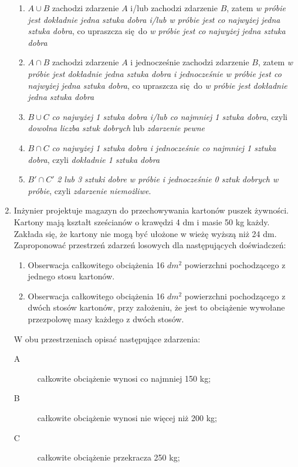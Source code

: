 \documentclass[twoside]{mwart}
\newcommand{\ans}[1]{}
\newenvironment{ansenv}{\comment}{\endcomment}
\newenvironment{ansenv}{\paragraph{Odpowiedź:}}{}
\newcommand{\ans}[1]{\begin{ansenv}#1\end{ansenv}}
\begin{document}
\begin{enumerate}
{\begin{enumerate}
\begin{itemize}
		\end{itemize}
		\item $A\cup B$ zachodzi zdarzenie $A$ i/lub zachodzi zdarzenie $B$, zatem \emph{w próbie jest dokładnie jedna sztuka dobra i/lub w próbie jest co najwyżej jedna sztuka dobra}, co upraszcza się do \emph{w próbie jest co najwyżej jedna sztuka dobra}
		\item $A\cap B$ zachodzi zdarzenie $A$ i jednocześnie zachodzi zdarzenie $B$, zatem \emph{w próbie jest dokładnie jedna sztuka dobra i jednocześnie w próbie jest co najwyżej jedna sztuka dobra}, co upraszcza się do \emph{w próbie jest dokładnie jedna sztuka dobra}
		\item $B\cup C$ \emph{co najwyżej 1 sztuka dobra i/lub co najmniej 1 sztuka dobra}, czyli \emph{dowolna liczba sztuk dobrych} lub \emph{zdarzenie pewne}
		\item $B\cap C$ \emph{co najwyżej 1 sztuka dobra i jednocześnie co najmniej 1 sztuka dobra}, czyli \emph{dokładnie 1 sztuka dobra}
		\item $B'\cap C'$ \emph{2 lub 3 sztuki dobre w próbie i jednocześnie 0 sztuk dobrych w próbie}, czyli \emph{zdarzenie niemożliwe}.
	\end{enumerate}
}
\item Inżynier projektuje magazyn do przechowywania kartonów puszek żywności. Kartony mają kształt sześcianów o krawędzi 4 dm i masie 50 kg każdy. Zakłada się, że kartony nie mogą być ułożone w wieżę wyższą niż 24 dm. Zaproponować przestrzeń zdarzeń losowych dla następujących doświadczeń:
\begin{enumerate}
\item Obserwacja całkowitego obciążenia 16 $dm^2$ powierzchni pochodzącego z jednego stosu kartonów.
\item Obserwacja całkowitego obciążenia 16 $dm^2$ powierzchni pochodzącego z dwóch stosów kartonów, przy założeniu, że jest to obciążenie wywołane przezpolowę masy każdego z dwóch stosów.
\end{enumerate}
W obu przestrzeniach opisać następujące zdarzenia:
\begin{description}
\item[A] całkowite obciążenie wynosi co najmniej 150 kg;
\item[B] całkowite obciążenie wynosi nie więcej niż 200 kg;
\item[C] całkowite obciążenie przekracza 250 kg;
\end{description}
\ans{
	Istnieje wiele możliwych rozwiązań, poniżej zaprezentowane są przykłady. Kryterium jest takie: w danej przestrzeni zdarzeń elementarnych musi dać się opisać jako jej podzbiory zdarzenia $A$, $B$, $C$ i dla danej obserwacji stosu/stosów kartonów musi dać się przypisać dokładnie jedno zdarzenie elementarne (ale może być tak że wielu obserwacjom przypisujemy to samo zdarzenie elementarne).
}
\end{enumerate}
\end{document}
